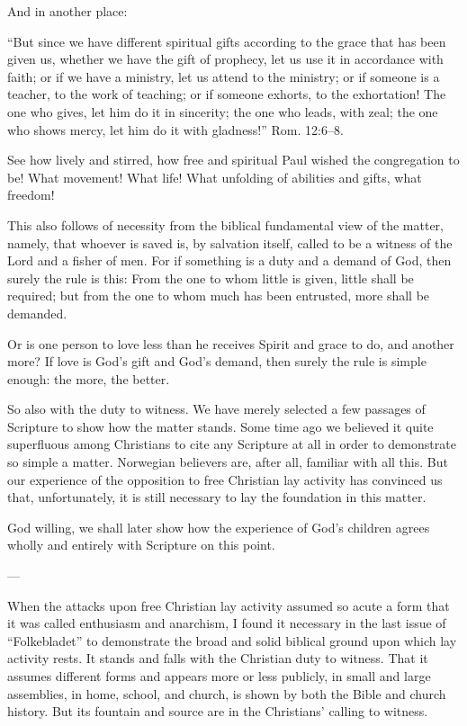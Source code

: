 And in another place:

“But since we have different spiritual gifts according to the grace that has been given us, whether we have the gift of prophecy, let us use it in accordance with faith; or if we have a ministry, let us attend to the ministry; or if someone is a teacher, to the work of teaching; or if someone exhorts, to the exhortation! The one who gives, let him do it in sincerity; the one who leads, with zeal; the one who shows mercy, let him do it with gladness!” Rom. 12:6–8.

See how lively and stirred, how free and spiritual Paul wished the congregation to be! What movement! What life! What unfolding of abilities and gifts, what freedom!

This also follows of necessity from the biblical fundamental view of the matter, namely, that whoever is saved is, by salvation itself, called to be a witness of the Lord and a fisher of men. For if something is a duty and a demand of God, then surely the rule is this: From the one to whom little is given, little shall be required; but from the one to whom much has been entrusted, more shall be demanded.

Or is one person to love less than he receives Spirit and grace to do, and another more? If love is God’s gift and God’s demand, then surely the rule is simple enough: the more, the better.

So also with the duty to witness. We have merely selected a few passages of Scripture to show how the matter stands. Some time ago we believed it quite superfluous among Christians to cite any Scripture at all in order to demonstrate so simple a matter. Norwegian believers are, after all, familiar with all this. But our experience of the opposition to free Christian lay activity has convinced us that, unfortunately, it is still necessary to lay the foundation in this matter.

God willing, we shall later show how the experience of God’s children agrees wholly and entirely with Scripture on this point.

---

When the attacks upon free Christian lay activity assumed so acute a form that it was called enthusiasm and anarchism, I found it necessary in the last issue of “Folkebladet” to demonstrate the broad and solid biblical ground upon which lay activity rests. It stands and falls with the Christian duty to witness. That it assumes different forms and appears more or less publicly, in small and large assemblies, in home, school, and church, is shown by both the Bible and church history. But its fountain and source are in the Christians’ calling to witness.

